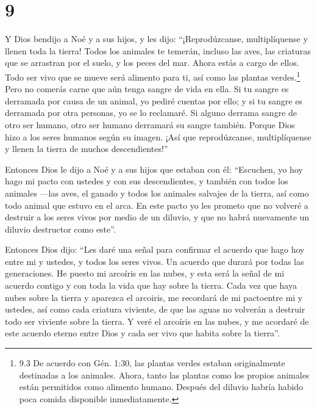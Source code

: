 \hypertarget{section-8}{%
\section{9}\label{section-8}}

 Y Dios bendijo a Noé y a sus hijos, y les dijo:
``¡Reprodúzcanse, multiplíquense y llenen toda la tierra! 
Todos los animales te temerán, incluso las aves, las criaturas que se
arrastran por el suelo, y los peces del mar. Ahora estás a cargo de
ellos.  Todo ser vivo que se mueve será alimento para ti,
así como las plantas verdes.\footnote{9.3 De acuerdo con Gén. 1:30, las
  plantas verdes estaban originalmente destinadas a los animales. Ahora,
  tanto las plantas como los propios animales están permitidos como
  alimento humano. Después del diluvio habría habido poca comida
  disponible inmediatamente.}  Pero no comerás carne que aún
tenga sangre de vida en ella.  Si tu sangre es derramada por
causa de un animal, yo pediré cuentas por ello; y si tu sangre es
derramada por otra personas, yo se lo reclamaré.  Si alguno
derrama sangre de otro ser humano, otro ser humano derramará su sangre
también. Porque Dios hizo a los seres humanos según su imagen.
 ¡Así que reprodúzcanse, multiplíquense y llenen la tierra
de muchos descendientes!''

 Entonces Dios le dijo a Noé y a sus hijos que estaban con
él:  ``Escuchen, yo hoy hago mi pacto con ustedes y con sus
descendientes,  y también con todos los animales ---las
aves, el ganado y todos los animales salvajes de la tierra, así como
todo animal que estuvo en el arca.  En este pacto yo les
prometo que no volveré a destruir a los seres vivos por medio de un
diluvio, y que no habrá nuevamente un diluvio destructor como este''.

 Entonces Dios dijo: ``Les daré una señal para confirmar el
acuerdo que hago hoy entre mi y ustedes, y todos los seres vivos. Un
acuerdo que durará por todas las generaciones.  He puesto
mi arcoíris en las nubes, y esta será la señal de mi acuerdo contigo y
con toda la vida que hay sobre la tierra.  Cada vez que
haya nubes sobre la tierra y aparezca el arcoiris,  me
recordará de mi pactoentre mi y ustedes, así como cada criatura
viviente, de que las aguas no volverán a destruir todo ser viviente
sobre la tierra.  Y veré el arcoíris en las nubes, y me
acordaré de este acuerdo eterno entre Dios y cada ser vivo que habita
sobre la tierra''.

